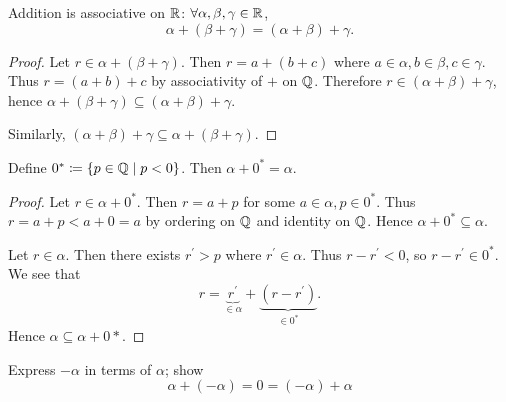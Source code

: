 \begin{proposition}
Addition is associative on $\mathbb R$: $\forall\alpha,\beta,\gamma\in\mathbb R$,
\[ \alpha+(\beta+\gamma)=(\alpha+\beta)+\gamma. \]
\end{proposition}

\begin{proof}
Let $r\in\alpha+(\beta+\gamma)$. Then $r=a+(b+c)$ where $a\in\alpha,b\in\beta,c\in\gamma$. Thus $r=(a+b)+c$ by associativity of $+$ on $\mathbb Q$. Therefore $r\in(\alpha+\beta)+\gamma$, hence $\alpha+(\beta+\gamma)\subseteq(\alpha+\beta)+\gamma$.

Similarly, $(\alpha+\beta)+\gamma\subseteq\alpha+(\beta+\gamma)$.
\end{proof}

\begin{proposition}
Define $0^*\coloneqq\{p\in\mathbb Q\mid p<0\}$. Then $\alpha+0^*=\alpha$.
\end{proposition}

\begin{proof}
Let $r\in\alpha+0^*$. Then $r=a+p$ for some $a\in\alpha,p\in0^*$. Thus $r=a+p<a+0=a$ by ordering on $\mathbb Q$ and identity on $\mathbb Q$. Hence $\alpha+0^*\subseteq\alpha$.

Let $r\in\alpha$. Then there exists $r^\prime>p$ where $r^\prime\in\alpha$. Thus $r-r^\prime<0$, so $r-r^\prime\in0^*$. We see that
\[ r=\underbrace{r^\prime}_{\in\alpha}+\underbrace{(r-r^\prime)}_{\in0^*}. \]
Hence $\alpha\subseteq\alpha+0*$.
\end{proof}


\begin{exercise}
Express $-\alpha$ in terms of $\alpha$; show
\[ \alpha+(-\alpha)=0=(-\alpha)+\alpha \]
\end{exercise}

